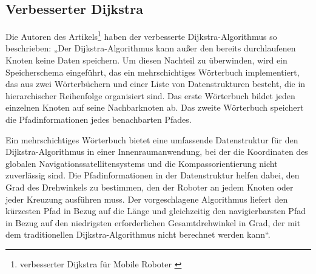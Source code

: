 \subsection{Verbesserter Dijkstra }
Die Autoren des Artikels\footnote{ verbesserter Dijkstra für Mobile Roboter \cite{vehicles3030027}} haben der verbesserte Dijkstra-Algorithmus so beschrieben:
„Der Dijkstra-Algorithmus kann außer den bereits durchlaufenen Knoten keine Daten speichern. Um diesen Nachteil zu überwinden, wird ein Speicherschema eingeführt, das ein mehrschichtiges Wörterbuch implementiert, das aus zwei Wörterbüchern und einer Liste von Datenstrukturen besteht, die in hierarchischer Reihenfolge organisiert sind. Das erste Wörterbuch bildet jeden einzelnen Knoten auf seine Nachbarknoten ab. Das zweite Wörterbuch speichert die Pfadinformationen jedes benachbarten Pfades.
\newline
\newline

Ein mehrschichtiges Wörterbuch bietet eine umfassende Datenstruktur für den Dijkstra-Algorithmus in einer Innenraumanwendung, bei der die Koordinaten des globalen Navigationssatellitensystems und die Kompassorientierung nicht zuverlässig sind. Die Pfadinformationen in der Datenstruktur helfen dabei, den Grad des Drehwinkels zu bestimmen, den der Roboter an jedem Knoten oder jeder Kreuzung ausführen muss. Der vorgeschlagene Algorithmus liefert den kürzesten Pfad in Bezug auf die Länge und gleichzeitig den navigierbarsten Pfad in Bezug auf den niedrigsten erforderlichen Gesamtdrehwinkel in Grad, der mit dem traditionellen Dijkstra-Algorithmus nicht berechnet werden kann“.

